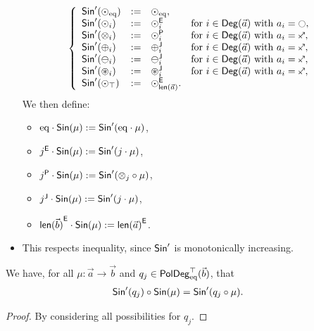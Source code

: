 \documentclass[a4paper]{memoir}
\begin{document}
\begin{definition}
\begin{itemize}
		\[
			\left\{ \begin{array}{l l l l}
				\Sin'(\nonpol_\eqtydeg) &:=& \nonpol_\eqtydeg, \\
				\Sin'(\nonpol_i) &:=& \nwnonpol_i &\text{for $i \in \Deg(\vec a)$ with $a_i = \npolar$}, \\
				\Sin'(\mixpol_i) &:=& \nwpathpol_i &\text{for $i \in \Deg(\vec a)$ with $a_i = \ypolar$}, \\
				\Sin'(\pospol_i) &:=& \nwpospol_i &\text{for $i \in \Deg(\vec a)$ with $a_i = \ypolar$}, \\
				\Sin'(\negpol_i) &:=& \nwnegpol_i &\text{for $i \in \Deg(\vec a)$ with $a_i = \ypolar$}, \\
				\Sin'(\isopol_i) &:=& \nwisopol_i &\text{for $i \in \Deg(\vec a)$ with $a_i = \ypolar$}, \\
				\Sin'(\nonpol_\top) &:=& \nwnonpol_{\lenpol{\vec a}}. \\
			\end{array} \right.
		\]
		We then define:
		\begin{itemize}
			\item ${\mathrm{eq}} \cdot {\mathsf{Sin}}(\mu) := {\mathsf{Sin}}'({\mathrm{eq}} \cdot \mu)$,
			\item ${j}^{\mathsf{E}} \cdot {\mathsf{Sin}}(\mu) := {\mathsf{Sin}}'(j \cdot \mu)$,
			\item ${j}^{\mathsf{P}} \cdot {\mathsf{Sin}}(\mu) := {\mathsf{Sin}}'({\otimes}_j \circ \mu)$,
			\item ${j}^{\mathsf{J}} \cdot {\mathsf{Sin}}(\mu) := {\mathsf{Sin}}'(j \cdot \mu)$,
			\item ${\mathsf{len}(\vec b)}^{\mathsf{E}} \cdot {\mathsf{Sin}}(\mu) := {\mathsf{len}(\vec a)}^{\mathsf{E}}$.
		\end{itemize}
		\item This respects inequality, since ${\mathsf{Sin}}'$ is monotonically increasing.
	\end{itemize}
\end{definition}
\begin{corollary} \label{thm:poresh-sin-char}
	We have, for all $\mu : \vec a \to \vec b$ and $q_j \in \mathsf{PolDeg}_{\mathrm{eq}}^\top(\vec b)$, that
	\begin{align*}
		{\mathsf{Sin}}'(q_j) \circ {\mathsf{Sin}}(\mu) &= {\mathsf{Sin}}'(q_j \circ \mu).
	\end{align*}
\end{corollary}
\begin{proof}
	By considering all possibilities for $q_j$.
\end{proof}
\end{document}

